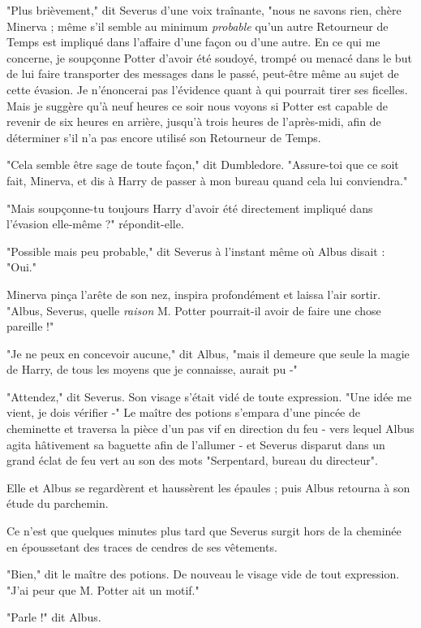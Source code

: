 "Plus brièvement," dit Severus d'une voix traînante, "nous ne savons rien, chère Minerva ; même s'il semble au minimum \emph{probable}  qu'un autre Retourneur de Temps est impliqué dans l'affaire d'une façon ou d'une autre. En ce qui me concerne, je soupçonne Potter d'avoir été soudoyé, trompé ou menacé dans le but de lui faire transporter des messages dans le passé, peut-être même au sujet de cette évasion. Je n'énoncerai pas l'évidence quant à qui pourrait tirer ses ficelles. Mais je suggère qu'à neuf heures ce soir nous voyons si Potter est capable de revenir de six heures en arrière, jusqu'à trois heures de l'après-midi, afin de déterminer s'il n'a pas encore utilisé son Retourneur de Temps.

"Cela semble être sage de toute façon," dit Dumbledore. "Assure-toi que ce soit fait, Minerva, et dis à Harry de passer à mon bureau quand cela lui conviendra."

"Mais soupçonne-tu toujours Harry d'avoir été directement impliqué dans l'évasion elle-même ?" répondit-elle.

"Possible mais peu probable," dit Severus à l'instant même où Albus disait : "Oui."

Minerva pinça l'arête de son nez, inspira profondément et laissa l'air sortir. "Albus, Severus, quelle \emph{raison}  M. Potter pourrait-il avoir de faire une chose pareille !"

"Je ne peux en concevoir aucune," dit Albus, "mais il demeure que seule la magie de Harry, de tous les moyens que je connaisse, aurait pu -"

"Attendez," dit Severus. Son visage s'était vidé de toute expression. "Une idée me vient, je dois vérifier -" Le maître des potions s'empara d'une pincée de cheminette et traversa la pièce d'un pas vif en direction du feu - vers lequel Albus agita hâtivement sa baguette afin de l'allumer - et Severus disparut dans un grand éclat de feu vert au son des mots "Serpentard, bureau du directeur".

Elle et Albus se regardèrent et haussèrent les épaules ; puis Albus retourna à son étude du parchemin.

Ce n'est que quelques minutes plus tard que Severus surgit hors de la cheminée en époussetant des traces de cendres de ses vêtements.

"Bien," dit le maître des potions. De nouveau le visage vide de tout expression. "J'ai peur que M. Potter ait un motif."

"Parle !" dit Albus.

